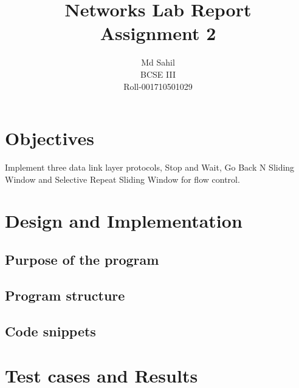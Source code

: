 \documentclass[titlepage]{article}
\title{Networks Lab Report\\Assignment 2}
\author{Md Sahil\\BCSE III\\Roll-001710501029}
\date{}
\begin{document}
{\maketitle}

\section{Objectives}
Implement three data link layer protocols, 
Stop and Wait, 
Go Back N Sliding Window 
and Selective Repeat Sliding Window for flow control.

\section{Design and Implementation}
\subsection{Purpose of the program}

\subsection{Program structure}

\subsection{Code snippets}

\section{Test cases and Results}
\end{document}

